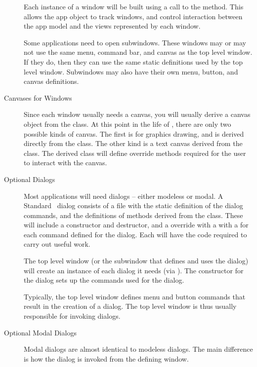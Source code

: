 \begin{description}
Each instance of a window will be built using a call to the
 method. This allows the app object
to track windows, and control interaction between the app
model and the views represented by each window. 

Some applications need to open subwindows. These windows may or
may not use the same menu, command bar, and canvas as the top
level window. If they do, then they can use the same static
definitions used by the top level window. Subwindows may also
have their own menu, button, and canvas definitions.

\item [Canvases for Windows]

Since each window usually needs a canvas, you will usually derive
a canvas object from the  class. At
this point in the life of \V, there are only two possible kinds
of canvas.  The first is for graphics drawing, and is
derived directly from the  class.  The other
kind is a text canvas derived from the 
class. The derived class will define override methods required
for the user to interact with the canvas.

\item [Optional Dialogs]

Most applications will need dialogs -- either modeless or modal.
A Standard \V\ dialog consists of a  file with the
static definition of the dialog commands, and the definitions
of methods derived from the  class. These will
include a constructor and destructor, and a 
override with a  with a  for each command
defined for the dialog. Each  will have the code
required to carry out useful work.

The top level window (or the subwindow that
defines and uses the dialog) will create an instance of each
dialog it needs (via ). The constructor for the
dialog sets up the commands used for the dialog.

Typically, the top level window defines menu and button commands
that result in the creation of a dialog. The top level window
is thus usually responsible for invoking dialogs.

\item [Optional Modal Dialogs]

Modal dialogs are almost identical to modeless dialogs. The main
difference is how the dialog is invoked from the defining window.


\end{description}
